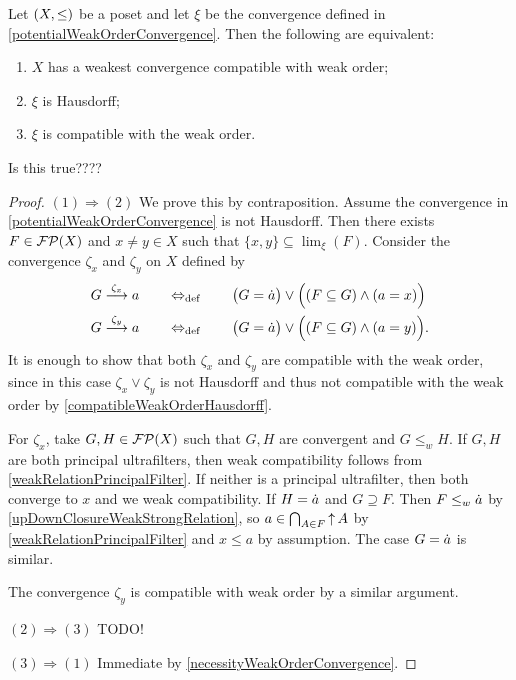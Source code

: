 \begin{proposition}
Let $\sSet{X,\leq}$ be a poset and let $\xi$ be the convergence defined in \ref{potentialWeakOrderConvergence}. Then the following are equivalent:
\begin{enumerate}
\item $X$ has a weakest convergence compatible with weak order;
\item $\xi$ is Hausdorff;
\item $\xi$ is compatible with the weak order.
\end{enumerate}
\end{proposition}
Is this true????
\begin{proof}
$(1) \Rightarrow (2)$ We prove this by contraposition. Assume the convergence in \ref{potentialWeakOrderConvergence} is not Hausdorff. Then there exists $F\in \operatorname{\mathcal{FP}}(X)$ and $x\neq y \in X$ such that $\{x,y\}\subseteq \lim_\xi(F)$. Consider the convergence $\zeta_x$ and $\zeta_y$ on $X$ defined by
\begin{align*}
G\overset{\zeta_x}{\longrightarrow} a \quad&\quad\Leftrightarrow_{\text{def}}\quad\quad \big(G = \dot{a}\big) \lor \Big( (F\subseteq G)\land (a = x) \Big) \\
G\overset{\zeta_y}{\longrightarrow} a \quad&\quad\Leftrightarrow_{\text{def}}\quad\quad \big(G = \dot{a}\big) \lor \Big( (F\subseteq G)\land (a = y) \Big).
\end{align*}
It is enough to show that both $\zeta_x$ and $\zeta_y$ are compatible with the weak order, since in this case $\zeta_x \vee \zeta_y$ is not Hausdorff and thus not compatible with the weak order by \ref{compatibleWeakOrderHausdorff}.

For $\zeta_x$, take $G, H\in \operatorname{\mathcal{FP}}(X)$ such that $G,H$ are convergent and $G\leq_w H$. If $G,H$ are both principal ultrafilters, then weak compatibility follows from \ref{weakRelationPrincipalFilter}. If neither is a principal ultrafilter, then both converge to $x$ and we weak compatibility.
If $H = \dot{a}$ and $G\supseteq F$. Then $F\leq_w \dot{a}$ by \ref{upDownClosureWeakStrongRelation}, so $a \in \bigcap_{A\in F}\operatorname{\uparrow} A$ by \ref{weakRelationPrincipalFilter} and $x\leq a$ by assumption. The case $G = \dot{a}$ is similar.

The convergence $\zeta_y$ is compatible with weak order by a similar argument.

$(2) \Rightarrow (3)$ TODO!

$(3) \Rightarrow (1)$ Immediate by \ref{necessityWeakOrderConvergence}.
\end{proof}


